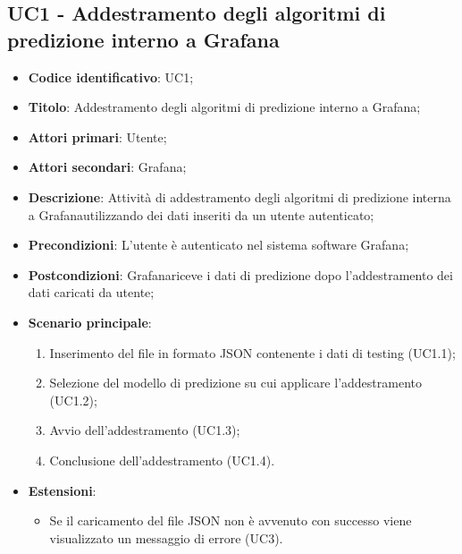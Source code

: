 \subsection{UC1 - Addestramento degli algoritmi di predizione interno a Grafana}
\begin{itemize}
	\item \textbf{Codice identificativo}: UC1;
	\item \textbf{Titolo}: Addestramento degli algoritmi di predizione interno a Grafana\glo;
	\item \textbf{Attori primari}: Utente;
	\item \textbf{Attori secondari}: Grafana\glo;
	\item \textbf{Descrizione}: Attività di addestramento degli algoritmi di predizione interna a Grafana\glosp utilizzando dei dati inseriti da un utente autenticato;
	\item \textbf{Precondizioni}: L'utente è autenticato nel sistema software Grafana\glosp;
	\item \textbf{Postcondizioni}: Grafana\glosp riceve i dati di predizione dopo l'addestramento dei dati caricati da utente;
	\item \textbf{Scenario principale}: 
		\begin{enumerate}
			\item Inserimento del file in formato JSON contenente i dati di testing (UC1.1);
			\item Selezione del modello di predizione su cui applicare l'addestramento (UC1.2);
			\item Avvio dell'addestramento (UC1.3);
			\item Conclusione dell'addestramento (UC1.4).
		\end{enumerate}
	\item \textbf{Estensioni}:
	\begin{itemize}
		\item Se il caricamento del file JSON non è avvenuto con successo viene visualizzato un messaggio di errore (UC3).
	\end{itemize}
\end{itemize}

